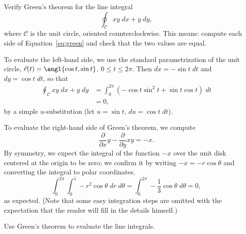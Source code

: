\documentclass[12pt]{exam}
\begin{document}
\begin{questions} 

\question Verify Green's theorem for the line integral
\begin{equation*}
    \oint_{\mathcal{C}} xy \; dx + y \; dy,
\end{equation*}
where $\mathcal{C}$ is the unit circle, oriented counterclockwise. This means: compute each side of Equation~\ref{eq:green} and check that the two values are equal.

\begin{solution}
    To evaluate the left-hand side, we use the standard parametrization of the unit circle, $\vec{r}(t) = \angl{\cos{t}, \sin{t}}$, $0 \leq t \leq 2\pi$. Then $dx = -\sin{t} \; dt$ and $dy = \cos{t} \; dt$, so that
    \begin{align*}
        \oint_{\mathcal{C}} xy \; dx + y \; dy &= \int_0^{2\pi} \left( - \cos{t} \sin^2{t} + \sin{t} \cos{t} \right) \; dt \\
        &= 0,
    \end{align*}
    by a simple $u$-substitution (let $u = \sin{t}$, $du = \cos{t} \; dt$).

    To evaluate the right-hand side of Green's theorem, we compute
    \begin{equation*}
        \frac{\partial}{\partial x} y - \frac{\partial}{\partial y} xy = -x.
    \end{equation*}
    By symmetry, we expect the integral of the function $-x$ over the unit disk centered at the origin to be zero; we confirm it by writing $-x = -r \cos {\theta}$ and converting the integral to polar coordinates.
    \begin{equation*}
        \int_0^{2\pi} \int_{0}^1 -r^2 \cos{\theta} \; dr \; d\theta = \int_{0}^{2\pi} -\frac{1}{3} \cos{\theta} \; d\theta = 0,
    \end{equation*}
    as expected. (Note that some easy integration steps are omitted with the expectation that the reader will fill in the details himself.)
\end{solution}

\question Use Green's theorem to evaluate the line integrals.
\end{questions}
\end{document}
